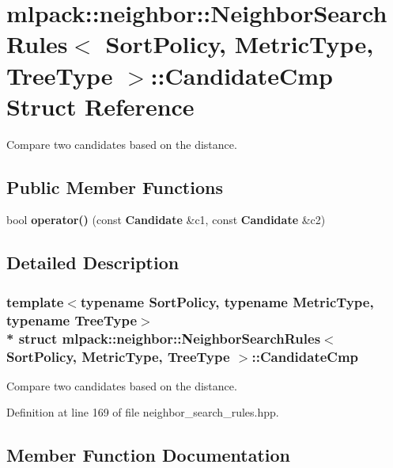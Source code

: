 \section{mlpack\+:\+:neighbor\+:\+:Neighbor\+Search\+Rules$<$ Sort\+Policy, Metric\+Type, Tree\+Type $>$\+:\+:Candidate\+Cmp Struct Reference}
\label{structmlpack_1_1neighbor_1_1NeighborSearchRules_1_1CandidateCmp}


Compare two candidates based on the distance.  


\subsection*{Public Member Functions}
\begin{DoxyCompactItemize}
\item 
bool {\bf operator()} (const {\bf Candidate} \&c1, const {\bf Candidate} \&c2)
\end{DoxyCompactItemize}


\subsection{Detailed Description}
\subsubsection*{template$<$typename Sort\+Policy, typename Metric\+Type, typename Tree\+Type$>$\\*
struct mlpack\+::neighbor\+::\+Neighbor\+Search\+Rules$<$ Sort\+Policy, Metric\+Type, Tree\+Type $>$\+::\+Candidate\+Cmp}

Compare two candidates based on the distance. 

Definition at line 169 of file neighbor\+\_\+search\+\_\+rules.\+hpp.



\subsection{Member Function Documentation}
